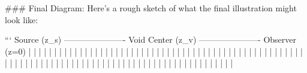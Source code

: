 ### Final Diagram:
Here’s a rough sketch of what the final illustration might look like:

```
Source (z_s) ---------------------- Void Center (z_v) ---------------------- Observer (z=0)
|                                   |                                   |
|                                   |                                   |
|                                   |                                   |
|                                   |                                   |
|                                   |                                   |
|                                   |                                   |
|                                   |                                   |
|                                   |                                   |
|                                   |                                   |
|                                   |                                   |
|                                   |                                   |
|                                   |                                   |
|                                   |                                   |
|                                   |                                   |
|                                   |                                   |
|                                   |                                   |
|                                   |                                   |
|                                   |                                   |
|                                   |                                   |
|                                   |                                   |
|                                   |                                   |
|                                   |                                   |
|                                   |                                   |
|                                   |                                   |
|                                   |                                   |
|                                   |                                   |
|                                   |                                   |
|                                   |                                   |
|                                   |                                   |
|                                   |                                   |
|                                   |                                   |
|                                   |                                   |
|                                   |                                   |
